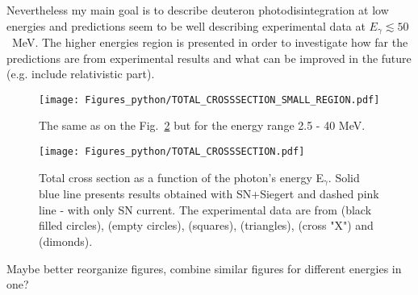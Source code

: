     Nevertheless my main goal is to describe deuteron photodisintegration at low energies and predictions seem to be well describing experimental data at
    $E_\gamma \lesssim 50$~MeV. The higher energies region is presented in order
    to investigate how far the predictions are from experimental results and 
    what can be improved in the future (e.g. include relativistic part). 
    
    \begin{figure}[h]
        \begin{center}
        \texttt{[image: Figures\_python/TOTAL\_CROSSSECTION\_SMALL\_REGION.pdf]}
        \end{center}
        \caption{The same as on the Fig.~\ref{TOTAL_CROSS} but for the energy range 2.5 - 40 MeV.
        }
        \label{TOTAL_CROSS_small}
    \end{figure}

    
    \begin{figure}[h]
        \begin{center}
        \texttt{[image: Figures\_python/TOTAL\_CROSSSECTION.pdf]}
        \end{center}
        \caption{Total cross section as a function of the photon's energy E$_\gamma$.
        Solid blue line presents results obtained with SN+Siegert 
        and dashed pink line - with only SN current.
        The experimental data are from \cite{Bernabei1986} (black filled circles),
        \cite{BOSMAN1979} (empty circles),
        \cite{ARENDS1984} (squares),
        \cite{Skopik1974} (triangles),
        \cite{Moreh1989} (cross "X") and
        \cite{Birenbaum1985} (dimonds).
        }
        \label{TOTAL_CROSS}
    \end{figure}
    
        
    {\color{red} Maybe better reorganize figures, combine similar figures for different energies in one?}

